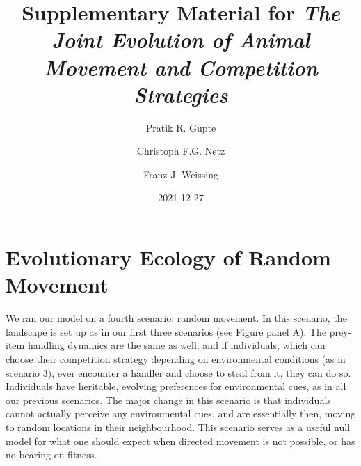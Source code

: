 \documentclass[]{article}
\title{Supplementary Material for \emph{The Joint Evolution of Animal Movement and Competition Strategies}}
\author{Pratik R. Gupte \and Christoph F.G. Netz \and Franz J. Weissing}
\date{2021-12-27}
\begin{document}
\maketitle

{
\setcounter{tocdepth}{2}
\tableofcontents
}
\newpage

\hypertarget{evolutionary-ecology-of-random-movement}{%
\section{Evolutionary Ecology of Random Movement}\label{evolutionary-ecology-of-random-movement}}

We ran our model on a fourth scenario: random movement.
In this scenario, the landscape is set up as in our first three scenarios (see Figure panel A).
The prey-item handling dynamics are the same as well, and if individuals, which can choose their competition strategy depending on environmental conditions (as in scenario 3), ever encounter a handler and choose to steal from it, they can do so.
Individuals have heritable, evolving preferences for environmental cues, as in all our previous scenarios.
The major change in this scenario is that individuals cannot actually perceive any environmental cues, and are essentially then, moving to random locations in their neighbourhood.
This scenario serves as a useful null model for what one should expect when directed movement is not possible, or has no bearing on fitness.
\end{document}
